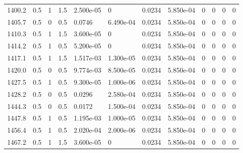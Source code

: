 \documentclass[preview]{standalone}
\begin{document}
{{{{{{{\begin{tabular}{L{1.2cm}C{1.2cm} C{0.3cm}C{0.5cm} C{1.4cm}C{1.4cm} C{1.4cm}C{1.4cm} C{1.6cm}C{1.6cm} C{1.6cm}C{1.6cm}}
  1400.2  &   0.5  & 1     & 1.5 &  2.500e-05  & 0  &  0.0234&   5.850e-04& 0 & 0   &  0 & 0  \\ 
  1405.7  &   0.5  & 0     & 0.5 &  0.0746  & 6.490e-04  &  0.0234&   5.850e-04& 0 & 0   &  0 & 0  \\ 
  1410.3  &   0.5  & 1     & 1.5 &  3.600e-05  & 0  &  0.0234&   5.850e-04& 0 & 0   &  0 & 0  \\ 
  1414.2  &   0.5  & 1     & 0.5 &  5.200e-05  & 0  &  0.0234&   5.850e-04& 0 & 0   &  0 & 0  \\ 
  1417.1  &   0.5  & 1     & 1.5 &  1.517e-03  & 1.300e-05  &  0.0234&   5.850e-04& 0 & 0   &  0 & 0  \\ 
  1420.0  &   0.5  & 0     & 0.5 &  9.774e-03  & 8.500e-05  &  0.0234&   5.850e-04& 0 & 0   &  0 & 0  \\ 
  1427.5  &   0.5  & 1     & 0.5 &  9.300e-05  & 1.000e-06  &  0.0234&   5.850e-04& 0 & 0   &  0 & 0  \\ 
  1428.2  &   0.5  & 0     & 0.5 &  0.0296  & 2.580e-04  &  0.0234&   5.850e-04& 0 & 0   &  0 & 0  \\ 
  1444.3  &   0.5  & 0     & 0.5 &  0.0172  & 1.500e-04  &  0.0234&   5.850e-04& 0 & 0   &  0 & 0  \\ 
  1447.8  &   0.5  & 1     & 0.5 &  1.195e-03  & 1.000e-05  &  0.0234&   5.850e-04& 0 & 0   &  0 & 0  \\ 
  1456.4  &   0.5  & 1     & 0.5 &  2.020e-04  & 2.000e-06  &  0.0234&   5.850e-04& 0 & 0   &  0 & 0  \\ 
  1467.2  &   0.5  & 1     & 1.5 &  3.600e-05  & 0  &  0.0234&   5.850e-04& 0 & 0   &  0 & 0  \\ 
\hline 
\end{tabular} 

}}}}}}}
\end{document}
